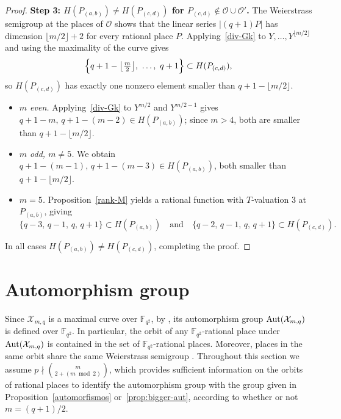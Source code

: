\documentclass[12pt]{amsart}
\theoremstyle{remark}
\theoremstyle{definition}
\def\Aut{{\rm Aut}}
\begin{document}
\begin{proof}
    \noindent\textbf{Step 3: $H(P_{(a,b)}) \neq H(P_{(c,d)})$ for 
    $P_{(c,d)} \notin \mathcal{O} \cup \mathcal{O}'$.}
    The Weierstrass semigroup at the places of $\mathcal{O}$ shows that 
    the linear series $|(q+1)P|$ has dimension $\lfloor m/2 \rfloor + 2$ 
    for every rational place $P$. Applying~\eqref{div-Gk} to 
    $Y, \ldots, Y^{\lfloor m/2 \rfloor}$ and using the maximality of the 
    curve gives
    \[
        \Bigl\{q+1-\bigl\lfloor\tfrac{m}{2}\bigr\rfloor,\ \ldots,\ q+1\Bigr\} 
        \subset H(P_{(c,d)}),
    \]
    so $H(P_{(c,d)})$ has exactly one nonzero element smaller than 
    $q+1 - \lfloor m/2 \rfloor$.
    \begin{itemize}
        \item \textit{$m$ even.} Applying~\eqref{div-Gk} to $Y^{m/2}$ 
        and $Y^{m/2-1}$ gives 
        $q+1-m,\, q+1-(m-2) \in H(P_{(a,b)})$; since $m > 4$, both are 
        smaller than $q+1-\lfloor m/2 \rfloor$.

        \item \textit{$m$ odd, $m \neq 5$.} We obtain 
        $q+1-(m-1),\, q+1-(m-3) \in H(P_{(a,b)})$, both smaller than 
        $q+1-\lfloor m/2 \rfloor$.

        \item \textit{$m = 5$.} Proposition~\ref{rank-M} yields a 
        rational function with $T$-valuation $3$ at $P_{(a,b)}$, giving
        \[
            \{q-3,\, q-1,\, q,\, q+1\} \subset H(P_{(a,b)}) 
            \quad \text{and} \quad 
            \{q-2,\, q-1,\, q,\, q+1\} \subset H(P_{(c,d)}).
        \]
    \end{itemize}
    In all cases $H(P_{(a,b)}) \neq H(P_{(c,d)})$, completing the proof.
\end{proof}

\section{Automorphism group}\label{sec:automorphisms}

Since $\mathcal{X}_{m,q}$ is a maximal curve over $\mathbb{F}_{q^2}$, 
by \cite[Theorem~3.10]{GSY}, its automorphism group $\Aut(\mathcal{X}_{m,q})$ 
is defined over $\mathbb{F}_{q^2}$. In particular, the orbit of any 
$\mathbb{F}_{q^2}$-rational place under $\Aut(\mathcal{X}_{m,q})$ is 
contained in the set of $\mathbb{F}_{q^2}$-rational places.
Moreover, places in the same orbit share the same Weierstrass semigroup 
\cite[Lemma~3.5.2]{stichtenoth}. Throughout this section we assume 
$p \nmid \binom{m}{2+(m \bmod 2)}$, which provides sufficient information 
on the orbits of rational places to identify the automorphism group with 
the group given in Proposition~\ref{automorfismos} or~\ref{prop:bigger-aut}, 
according to whether or not $m = (q+1)/2$.
\end{document}
